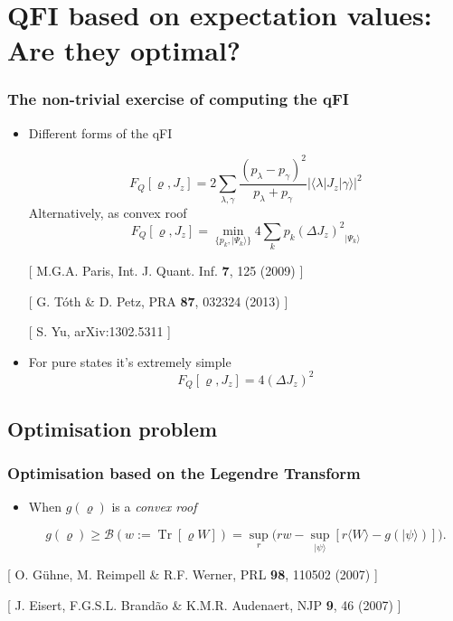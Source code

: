 \documentclass{beamer}
\DeclareMathOperator{\Tr}{Tr}
\newcommand{\ket}[1]{\ensuremath{\vert #1 \rangle}}
\newcommand{\braOket}[3]{\ensuremath{\langle #1 \vert #2 \vert #3 \rangle}}
\newcommand{\expect}[1]{\ensuremath{\langle #1 \rangle}}
\newcommand{\varian}[1]{\ensuremath{\left(\Delta #1 \right)^2}}
\newcommand{\tr}[1]{\ensuremath{\Tr \lcua #1\rcua}}
\newcommand{\citate}[1]{{\footnotesize{\color{gray}[ #1 ]}}

	}
\def\lcua{\left[}
\def\rcua{\right]}
\begin{document}
\section[QFI based on expectation values]{QFI based on expectation values: Are they optimal?}

	\begin{frame}
		\tableofcontents[currentsection]

	\end{frame}

	\begin{frame}
		\frametitle{The non-trivial exercise of computing the qFI}

		\begin{itemize}
			\item<1-> Different forms of the qFI
				\begin{block}
					{}
					\small
					\[
						F_Q[\varrho,J_z]=2 \sum_{\lambda,\gamma} \frac{(p_\lambda-p_\gamma)^2}{p_\lambda+p_\gamma} |\braOket{\lambda}{J_z}{\gamma}|^2
					\]
					\hspace{10px}Alternatively, as convex roof
					\[
					  F_Q[\varrho,J_z]=\min_{\{p_k,\ket{\Psi_k}\}} 4\sum_k p_k \varian{J_z}_{\ket{\Psi_k}}
					\]
				\end{block}
				\citate{M.G.A. Paris, Int. J. Quant. Inf. \textbf{7}, 125 (2009)}
				\citate{G. T\'oth \& D. Petz, PRA \textbf{87}, 032324 (2013)}
				\citate{S. Yu, arXiv:1302.5311}
				\vspace{2px}

			\item<2-> For pure states it's extremely simple
				{\small
				\[
					F_Q[\varrho,J_z] = 4\varian{J_z}
				\]
				}

		\end{itemize}

	\end{frame}

	\subsection{Optimisation problem}

		\begin{frame}
			\frametitle{Optimisation based on the Legendre Transform}
			\begin{itemize}
				\item When $g(\varrho)$ is a \emph{\color{blue} convex roof}
					\begin{block}
						{}
						{\small
						\vspace{8px}
						\[
						g(\varrho)\geq\mathcal{B}(w:=\tr{\varrho W}) = \sup_{r} \big( r w - \sup_{\ket{\psi}} [ r\expect{W} - g(\ket{\psi}) ] \big).
						\]}
					\end{block}
			\end{itemize}

			\citate{O. G\"uhne, M. Reimpell \& R.F. Werner, PRL \textbf{98}, 110502 (2007)}
			\citate{J. Eisert, F.G.S.L. Brand\~ao \& K.M.R. Audenaert, NJP \textbf{9}, 46 (2007)}
		\end{frame}
\end{document}
